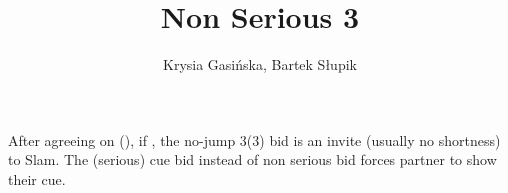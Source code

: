 \documentclass[12pt, a4paper]{article}
\title{Non Serious 3\nt}
\author{Krysia Gasińska, Bartek Słupik}
\begin{document}
\maketitle


After agreeing on \hearts (\spades), if \gf, the no-jump 3\spades (3\nt) bid is
an invite (usually no shortness) to Slam. The (serious) cue bid instead of non serious bid
forces partner to show their cue.


\end{document}
